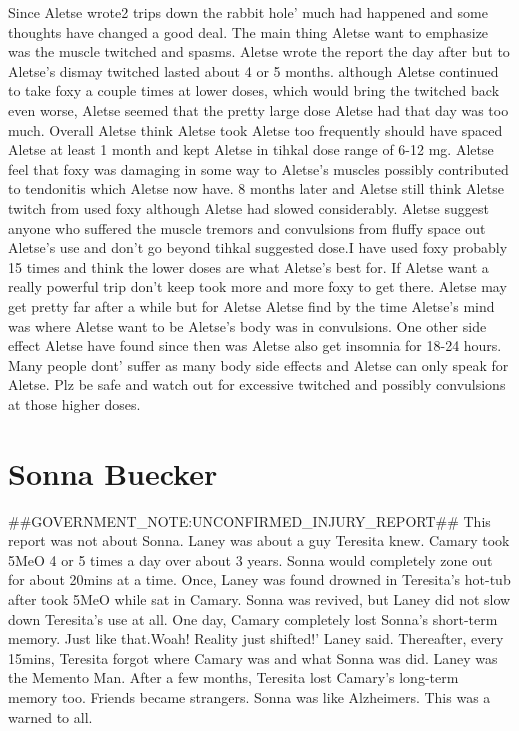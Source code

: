 \documentclass[12pt]{book}
\begin{document}
Since Aletse wrote2 trips down the rabbit hole' much had happened and some thoughts have changed a good deal. The main thing Aletse want to emphasize was the muscle twitched and spasms. Aletse wrote the report the day after but to Aletse's dismay twitched lasted about 4 or 5 months. although Aletse continued to take foxy a couple times at lower doses, which would bring the twitched back even worse, Aletse seemed that the pretty large dose Aletse had that day was too much. Overall Aletse think Aletse took Aletse too frequently should have spaced Aletse at least 1 month and kept Aletse in tihkal dose range of 6-12 mg. Aletse feel that foxy was damaging in some way to Aletse's muscles possibly contributed to tendonitis which Aletse now have. 8 months later and Aletse still think Aletse twitch from used foxy although Aletse had slowed considerably. Aletse suggest anyone who suffered the muscle tremors and convulsions from fluffy space out Aletse's use and don't go beyond tihkal suggested dose.I have used foxy probably 15 times and think the lower doses are what Aletse's best for. If Aletse want a really powerful trip don't keep took more and more foxy to get there. Aletse may get pretty far after a while but for Aletse Aletse find by the time Aletse's mind was where Aletse want to be Aletse's body was in convulsions. One other side effect Aletse have found since then was Aletse also get insomnia for 18-24 hours. Many people dont' suffer as many body side effects and Aletse can only speak for Aletse. Plz be safe and watch out for excessive twitched and possibly convulsions at those higher doses.



\chapter{Sonna Buecker}

\#\#GOVERNMENT\_NOTE:UNCONFIRMED\_INJURY\_REPORT\#\# This report was not about Sonna. Laney was about a guy Teresita knew. Camary took 5MeO 4 or 5 times a day over about 3 years. Sonna would completely zone out for about 20mins at a time. Once, Laney was found drowned in Teresita's hot-tub after took 5MeO while sat in Camary. Sonna was revived, but Laney did not slow down Teresita's use at all. One day, Camary completely lost Sonna's short-term memory. Just like that.Woah! Reality just shifted!' Laney said. Thereafter, every 15mins, Teresita forgot where Camary was and what Sonna was did. Laney was the Memento Man. After a few months, Teresita lost Camary's long-term memory too. Friends became strangers. Sonna was like Alzheimers. This was a warned to all.
\end{document}
